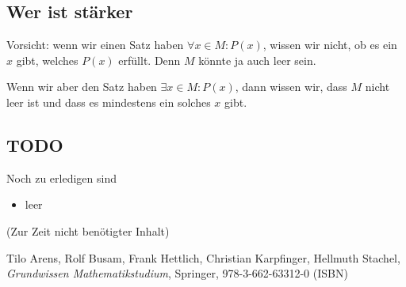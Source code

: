 \documentclass[a4paper]{amsart}
\theoremstyle{definition}
\begin{document}
\subsection{Wer ist stärker}
Vorsicht: wenn wir einen Satz haben $\forall x \in M \colon P(x)$, wissen wir nicht, ob es ein $x$ gibt, welches $P(x)$ erfüllt. Denn $M$ könnte ja auch leer sein.

Wenn wir aber den Satz haben $\exists x \in M \colon P(x)$, dann wissen wir, dass $M$ nicht leer ist und dass es mindestens ein solches $x$ gibt.


\begin{backup}
\section{TODO}
Noch zu erledigen sind
\begin{itemize}
   \item leer
\end{itemize}
\end{backup}

\begin{backup}
    (Zur Zeit nicht benötigter Inhalt)
\end{backup}

\begin{thebibliography}{9}

      Tilo Arens, Rolf Busam, Frank Hettlich, Christian Karpfinger, Hellmuth Stachel, \emph{Grundwissen Mathematikstudium},
      Springer, 978-3-662-63312-0 (ISBN)
      
\end{thebibliography}
\end{document}
